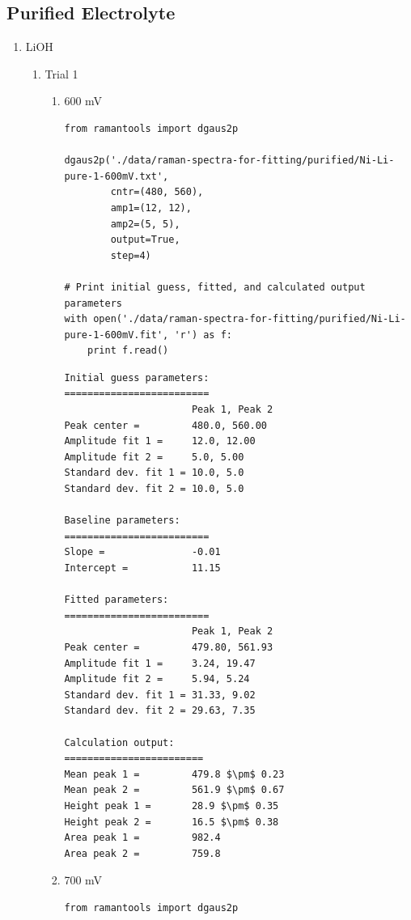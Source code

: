 \documentclass[journal=jpccck,manuscript=suppinfo,email=true]{achemso}
\begin{document}
\subsection{Purified Electrolyte}
\label{sec-4-1}
\begin{enumerate}
\item LiOH
\label{sec-4-1-0-1}
\begin{enumerate}
\item Trial 1
\label{sec-4-1-0-1-1}
\begin{enumerate}
\item 600 mV
\label{sec-4-1-0-1-1-1}
\begin{verbatim}
from ramantools import dgaus2p

dgaus2p('./data/raman-spectra-for-fitting/purified/Ni-Li-pure-1-600mV.txt',
        cntr=(480, 560),
        amp1=(12, 12),
        amp2=(5, 5),
        output=True,
        step=4)

# Print initial guess, fitted, and calculated output parameters
with open('./data/raman-spectra-for-fitting/purified/Ni-Li-pure-1-600mV.fit', 'r') as f:
    print f.read()
\end{verbatim}

\begin{verbatim}
Initial guess parameters:
=========================
                      Peak 1, Peak 2
Peak center =         480.0, 560.00
Amplitude fit 1 =     12.0, 12.00
Amplitude fit 2 =     5.0, 5.00
Standard dev. fit 1 = 10.0, 5.0
Standard dev. fit 2 = 10.0, 5.0

Baseline parameters:
=========================
Slope =               -0.01
Intercept =           11.15

Fitted parameters:
=========================
                      Peak 1, Peak 2
Peak center =         479.80, 561.93
Amplitude fit 1 =     3.24, 19.47
Amplitude fit 2 =     5.94, 5.24
Standard dev. fit 1 = 31.33, 9.02
Standard dev. fit 2 = 29.63, 7.35

Calculation output:
========================
Mean peak 1 =         479.8 $\pm$ 0.23
Mean peak 2 =         561.9 $\pm$ 0.67
Height peak 1 =       28.9 $\pm$ 0.35
Height peak 2 =       16.5 $\pm$ 0.38
Area peak 1 =         982.4
Area peak 2 =         759.8
\end{verbatim}

\item 700 mV
\label{sec-4-1-0-1-1-2}
\begin{verbatim}
from ramantools import dgaus2p


\end{verbatim}
\end{enumerate}
\end{enumerate}
\end{enumerate}
\end{document}
